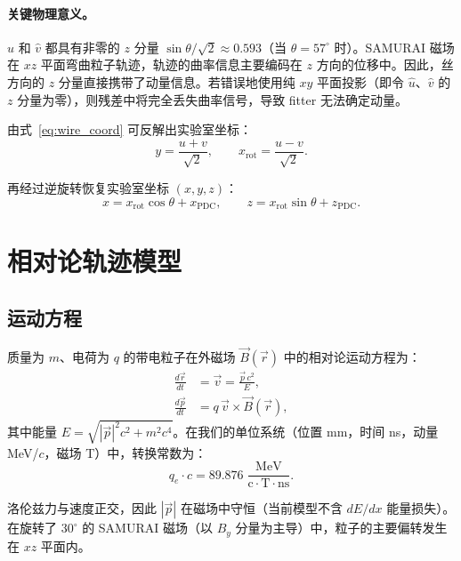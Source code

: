 \documentclass[a4paper, 11pt]{article}
\begin{document}
\paragraph{关键物理意义。}
$\hat{u}$ 和 $\hat{v}$ 都具有非零的 $z$ 分量 $\sin\theta/\sqrt{2} \approx 0.593$（当 $\theta = 57^\circ$ 时）。SAMURAI 磁场在 $xz$ 平面弯曲粒子轨迹，轨迹的曲率信息主要编码在 $z$ 方向的位移中。因此，丝方向的 $z$ 分量直接携带了动量信息。若错误地使用纯 $xy$ 平面投影（即令 $\hat{u}$、$\hat{v}$ 的 $z$ 分量为零），则残差中将完全丢失曲率信号，导致 fitter 无法确定动量。

由式~\eqref{eq:wire_coord} 可反解出实验室坐标：
\begin{equation}
  y = \frac{u + v}{\sqrt{2}}, \qquad
  x_\mathrm{rot} = \frac{u - v}{\sqrt{2}}.
\end{equation}

再经过逆旋转恢复实验室坐标 $(x, y, z)$：
\begin{equation}
  x = x_\mathrm{rot} \cos\theta + x_\mathrm{PDC}, \qquad
  z = x_\mathrm{rot} \sin\theta + z_\mathrm{PDC}.
\end{equation}

\section{相对论轨迹模型}

\subsection{运动方程}

质量为 $m$、电荷为 $q$ 的带电粒子在外磁场 $\vec{B}(\vec{r})$ 中的相对论运动方程为：
\begin{align}
  \frac{d\vec{r}}{dt} &= \vec{v} = \frac{\vec{p}\,c^2}{E}, \label{eq:eom_r} \\
  \frac{d\vec{p}}{dt} &= q\,\vec{v} \times \vec{B}(\vec{r}), \label{eq:eom_p}
\end{align}
其中能量 $E = \sqrt{|\vec{p}|^2 c^2 + m^2 c^4}$。在我们的单位系统（位置 mm，时间 ns，动量 MeV/$c$，磁场 T）中，转换常数为：
\begin{equation}
  q_e \cdot c = 89.876\;\frac{\mathrm{MeV}}{\mathrm{c \cdot T \cdot ns}}.
\end{equation}

洛伦兹力与速度正交，因此 $|\vec{p}|$ 在磁场中守恒（当前模型不含 $dE/dx$ 能量损失）。在旋转了 $30^\circ$ 的 SAMURAI 磁场（以 $B_y$ 分量为主导）中，粒子的主要偏转发生在 $xz$ 平面内。
\end{document}
